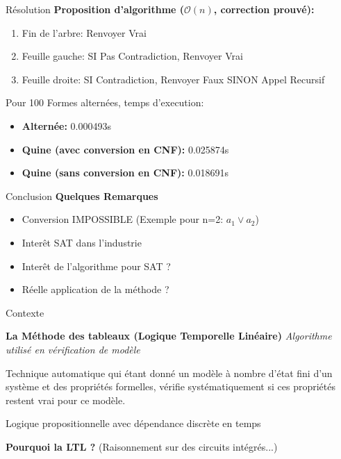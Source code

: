 \documentclass{beamer}
\begin{document}
\begin{frame}[fragile]{Résolution}
    \textbf{Proposition d'algorithme ($\mathcal{O}(n)$, correction prouvé):}
    \begin{enumerate}
        \item Fin de l'arbre: Renvoyer Vrai
        \item Feuille gauche: SI Pas Contradiction, Renvoyer Vrai
        \item Feuille droite: SI Contradiction, Renvoyer Faux SINON Appel Recursif
    \end{enumerate}
    \pause

    \vspace{10px}
    Pour 100 Formes alternées, temps d'execution:
    \begin{itemize}
        \item \textbf{Alternée:} 0.000493s
        \item \textbf{Quine (avec conversion en CNF):} 0.025874s
        \item \textbf{Quine (sans conversion en CNF):} 0.018691s
    \end{itemize} 

\end{frame}
 
\begin{frame}{Conclusion}
    \textbf{Quelques Remarques}
    \begin{itemize}[<+->]
        \item Conversion IMPOSSIBLE (Exemple pour n=2: $a_1\lor a_2$)
        \item Interêt SAT dans l'industrie
        \item Interêt de l'algorithme pour SAT ?
        \item Réelle application de la méthode ?
    \end{itemize}
\end{frame}

\begin{frame}{Contexte}
    \begin{center}
        \textbf{La Méthode des tableaux (Logique Temporelle Linéaire)}
        \textit{Algorithme utilisé en vérification de modèle}
    \end{center}
    \begin{definition}
    Technique automatique qui étant donné un modèle à nombre d'état fini d'un système et des propriétés formelles,
    vérifie systématiquement si ces propriétés restent vrai pour ce modèle.
    \end{definition}
    \begin{definition}
    Logique propositionnelle avec dépendance discrète en temps
    \end{definition}
    \pause
    \textbf{Pourquoi la LTL ?} (Raisonnement sur des circuits intégrés...)
\end{frame}
\end{document}
